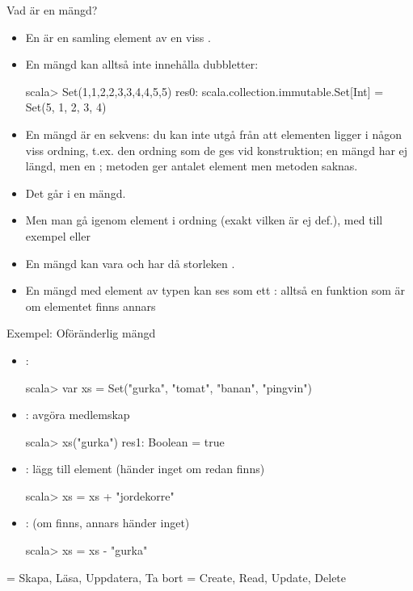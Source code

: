 \begin{Slide}{Vad är en mängd?}\SlideFontSmall
\begin{itemize}
\item En  är en samling  element av en viss .
\item En mängd kan alltså inte innehålla dubbletter:
\begin{REPLnonum}
scala> Set(1,1,2,2,3,3,4,4,5,5)
res0: scala.collection.immutable.Set[Int] =
  Set(5, 1, 2, 3, 4)
\end{REPLnonum}
\item En mängd är   en sekvens: du kan inte utgå från att elementen ligger i någon viss ordning, t.ex. den ordning som de ges vid konstruktion; en mängd har ej längd, men en ; metoden  ger antalet element men metoden  saknas.
\item Det går  i en mängd.
\item Men man  gå igenom element i  ordning (exakt vilken är ej def.), med till exempel  eller 
\item En mängd kan vara  och har då storleken .
\pause
\item En mängd  med element av typen  kan ses som ett : alltså en funktion  som är  om elementet finns annars 
\end{itemize}
\end{Slide}


\begin{Slide}{Exempel: Oföränderlig mängd}
\setlength{\leftmargini}{1em}
\begin{itemize}
\item {}:
\begin{REPLnonum}
scala> var xs = Set("gurka", "tomat", "banan", "pingvin")
\end{REPLnonum}

\item {}: avgöra medlemskap
\begin{REPLnonum}
scala> xs("gurka")
res1: Boolean = true
\end{REPLnonum}

\item {}: lägg till element (händer inget om redan finns)
\begin{REPLnonum}
scala> xs = xs + "jordekorre"
\end{REPLnonum}

\item {}: (om finns, annars händer inget)
\begin{REPLnonum}
scala> xs = xs - "gurka"
\end{REPLnonum}
\end{itemize}
{\SlideFontTiny{} = Skapa, Läsa, Uppdatera, Ta bort \hfill{} = Create, Read, Update, Delete}
\end{Slide}




